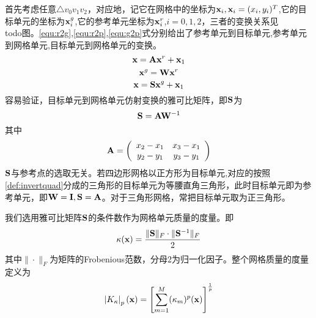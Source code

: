 首先考虑任意$\triangle v_0v_1v_2$，对应地，记它在网格中的坐标为$\mathbf{x}_i,\mathbf{x}_i=(x_i,y_i)^T$,它的目标单元的坐标为$\mathbf{x}^g_i$,它的参考单元坐标为$\mathbf{x}^r_i$,$i=0,1,2$，三者的变换关系见\\todo{图}。\ref{equ:r2g},\ref{equ:r2p},\ref{equ:g2p}式分别给出了参考单元到目标单元,参考单元到网格单元,目标单元到网格单元的变换。
\begin{equation}\label{equ:r2g}
\mathbf{x}=\mathbf{A} \mathbf{x}^r+\mathbf{x}_1
\end{equation}
\begin{equation}\label{equ:r2p}
\mathbf{x}^g=\mathbf{W} \mathbf{x}^r
\end{equation}
\begin{equation}\label{equ:g2p}
\mathbf{x}=\mathbf{S} \mathbf{x}^g+\mathbf{x}_1
\end{equation}
容易验证，目标单元到网格单元仿射变换的雅可比矩阵，即$\mathbf{S}$为
\begin{equation}\label{equ:aff-jacob}
\mathbf{S}=\mathbf{A} \mathbf{W}{^{-1}}
\end{equation}
其中
\begin{equation} \label{equ:affA}
\mathbf{A}=
\left(
\begin{array}{cc}
x_2-x_1 & x_3-x_1 \\ 
y_2-y_1 & y_3-y_1
\end{array} 
\right)
\end{equation}
$\mathbf{S}$与参考点的选取无关。若四边形网格以正方形为目标单元,对应的按照\ref{def:invertquad}分成的三角形的目标单元为等腰直角三角形，此时目标单元即为参考单元，即$\mathbf{W}=\mathbf{I},\mathbf{S}=\mathbf{A}$。对于三角形网格，常把目标单元取为正三角形。

我们选用雅可比矩阵$\mathbf{S}$的条件数作为网格单元质量的度量。即
\begin{equation}\label{equ:Jac-condition}
\kappa(\mathbf{x})=\frac{\|\mathbf{S}\|_F \cdot \|\mathbf{S}^{-1}\|_F}{2}
\end{equation}
其中$\|\cdot\|_F$为矩阵的Frobenious范数，分母2为归一化因子。整个网格质量的度量定义为
\begin{equation}\label{equ:mesh-metric}
\left|K_{\kappa}\right|_p(\mathbf{x})=\left[\sum_{m=1}^M(\kappa_m)^p(\mathbf{x})\right]^{\frac{1}{p}}
\end{equation}
